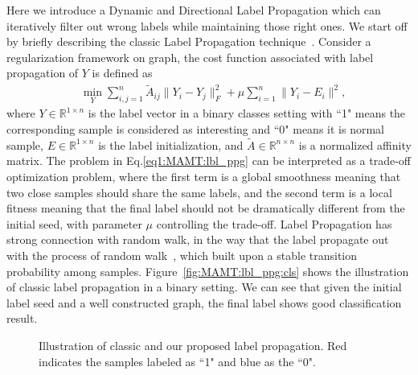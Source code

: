 Here we introduce a Dynamic and Directional Label Propagation which can iteratively filter out wrong labels while maintaining those right ones. We start off by briefly describing the classic Label Propagation technique~\cite{wang2008graph, nie2010general}.  Consider a regularization framework on graph, the cost function associated with label propagation of $Y$ is defined as
\begin{align}
\label{eq1:MAMT:lbl_ppg}
& \min_{Y}  \sum_{i,j=1}^n \tilde{A}_{ij}\|Y_i-Y_j\|_F^2+\mu\sum_{i=1}^n\|Y_i-E_i\|^2,
\end{align}
where $Y \in \mathbb{R}^{1 \times n}$ is the label vector in a binary classes setting with ``1" means the corresponding sample is considered as interesting and ``0" means it is normal sample, $E \in \mathbb{R}^{1 \times n}$ is the label initialization, and $\tilde{A} \in \mathbb{R}^{n \times n}$  is a normalized affinity matrix.  The problem in Eq.\ref{eq1:MAMT:lbl_ppg} can be interpreted as a trade-off optimization problem, where the first term is a global smoothness meaning that two close samples should share the same labels, and the second term is a local fitness meaning that the final label should not be dramatically different from the initial seed, with parameter $\mu$ controlling the trade-off.  Label Propagation has strong connection with random walk, in the way that the label propagate out with the process of random walk~\cite{nie2010general}, which built upon a stable transition probability among samples. Figure~\ref{fig:MAMT:lbl_ppg:cls} shows the illustration of classic label propagation in a binary setting. We can see that given the initial label seed and a well constructed graph, the final label shows good classification result. 

\begin{figure}[htb]
\centering
{}
\caption{Illustration of classic and our proposed label propagation. Red indicates the samples labeled as ``1" and blue as the ``0". }
\label{fig:MAMT:lbl_ppg}
\end{figure}

